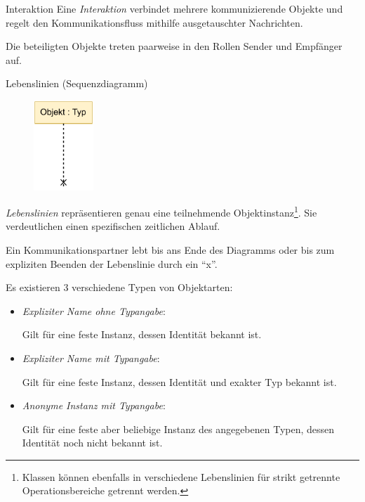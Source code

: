 \begin{diag}{Interaktion}
    Eine \emph{Interaktion} verbindet mehrere kommunizierende Objekte und regelt den Kommunikationsfluss mithilfe ausgetauschter Nachrichten.

    Die beteiligten Objekte treten paarweise in den Rollen Sender und Empfänger auf.
\end{diag}

\begin{diag}{Lebenslinien (Sequenzdiagramm)}
    \begin{figure}
        \centering
        \includegraphics[width=0.2\textwidth]{includes/figures/defi_diagrams_sequenz_object.pdf}
    \end{figure}
    \emph{Lebenslinien} repräsentieren genau eine teilnehmende Objektinstanz\footnote{Klassen können ebenfalls in verschiedene Lebenslinien für strikt getrennte Operationsbereiche getrennt werden.}.
    Sie verdeutlichen einen spezifischen zeitlichen Ablauf.

    Ein Kommunikationspartner lebt bis ans Ende des Diagramms oder bis zum expliziten Beenden der Lebenslinie durch ein \enquote{x}.

    Es existieren 3 verschiedene Typen von Objektarten:
    \begin{itemize}
        \item \emph{Expliziter Name ohne Typangabe}:

              Gilt für eine feste Instanz, dessen Identität bekannt ist.
        \item \emph{Expliziter Name mit Typangabe}:

              Gilt für eine feste Instanz, dessen Identität und exakter Typ bekannt ist.
        \item \emph{Anonyme Instanz mit Typangabe}:

              Gilt für eine feste aber beliebige Instanz des angegebenen Typen, dessen Identität noch nicht bekannt ist.
    \end{itemize}
\end{diag}

